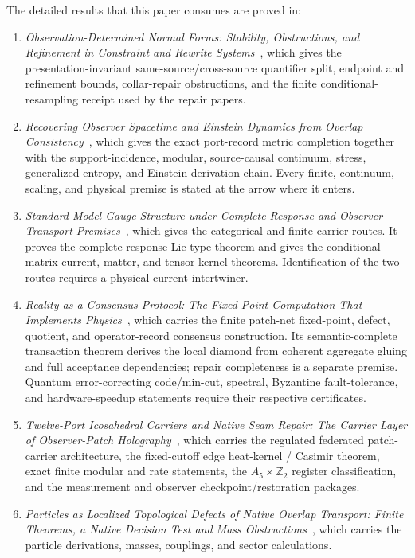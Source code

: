 \documentclass[11pt]{article}
\begin{document}
The detailed results that this paper consumes are proved in:
\begin{enumerate}[leftmargin=2em]
\item \emph{Observation-Determined Normal Forms: Stability, Obstructions, and Refinement in Constraint and Rewrite Systems}~\cite{observableNormalForms}, which gives the presentation-invariant same-source/cross-source quantifier split, endpoint and refinement bounds, collar-repair obstructions, and the finite conditional-resampling receipt used by the repair papers.
\item \emph{Recovering Observer Spacetime and Einstein Dynamics from Overlap
Consistency}~\cite{ophEinstein}, which gives the exact port-record metric
completion together with the support-incidence, modular, source-causal continuum,
stress, generalized-entropy, and Einstein derivation chain. Every finite,
continuum, scaling, and physical premise is stated at the arrow where it
enters.
\item \emph{Standard Model Gauge Structure under Complete-Response and Observer-Transport Premises}~\cite{ophGauge}, which gives the categorical and finite-carrier routes. It proves the complete-response Lie-type theorem and gives the conditional matrix-current, matter, and tensor-kernel theorems. Identification of the two routes requires a physical current intertwiner.
\item \emph{Reality as a Consensus Protocol: The Fixed-Point Computation That Implements Physics}~\cite{ophconsensus}, which carries the finite patch-net fixed-point, defect, quotient, and operator-record consensus construction. Its semantic-complete transaction theorem derives the local diamond from coherent aggregate gluing and full acceptance dependencies; repair completeness is a separate premise. Quantum error-correcting code/min-cut, spectral, Byzantine fault-tolerance, and hardware-speedup statements require their respective certificates.
\item \emph{Twelve-Port Icosahedral Carriers and Native Seam Repair: The Carrier Layer of Observer-Patch Holography}~\cite{ophmicrophysics}, which carries the regulated federated patch-carrier architecture, the fixed-cutoff edge heat-kernel / Casimir theorem, exact finite modular and rate statements, the \(A_5\times\mathbb Z_2\) register classification, and the measurement and observer checkpoint/restoration packages.
\item \emph{Particles as Localized Topological Defects of Native Overlap Transport: Finite Theorems, a Native Decision Test and Mass Obstructions}~\cite{ophparticles}, which carries the particle derivations, masses, couplings, and sector calculations.

\end{enumerate}
\end{document}
